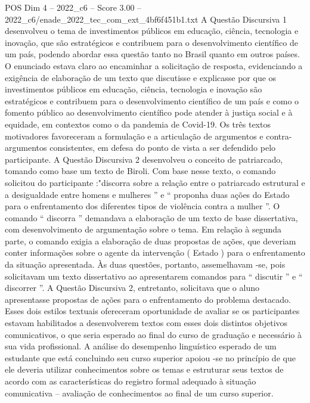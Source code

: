\begin{textsample}{POS Dim 4 – 2022\_c6 – Score 3.00 – 2022\_c6/enade\_2022\_tec\_com\_ext\_4bf6f451b1.txt}
A Questão Discursiva 1 desenvolveu o tema de investimentos públicos em educação, ciência, tecnologia e inovação, que são estratégicos e contribuem para o desenvolvimento científico de um país, podendo abordar essa questão tanto no Brasil quanto em outros países.
O enunciado estava claro ao encaminhar a solicitação de resposta, evidenciando a exigência de elaboração de um texto que discutisse e explicasse por que os investimentos públicos em educação, ciência, tecnologia e inovação são estratégicos e contribuem para o desenvolvimento científico de um país e como o fomento público ao desenvolvimento científico pode atender à justiça social e à equidade, em contextos como o da pandemia de Covid-19.
Os três textos motivadores favoreceram a formulação e a articulação de argumentos e contra-argumentos consistentes, em defesa do ponto de vista a ser defendido pelo participante.
A Questão Discursiva 2 desenvolveu o conceito de patriarcado, tomando como base um texto de Biroli.
Com base nesse texto, o comando solicitou do participante :"discorra sobre a relação entre o patriarcado estrutural e a desigualdade entre homens e mulheres ” e “ proponha duas ações do Estado para o enfrentamento dos diferentes tipos de violência contra a mulher ”.
O comando “ discorra ” demandava a elaboração de um texto de base dissertativa, com desenvolvimento de argumentação sobre o tema.
Em relação à segunda parte, o comando exigia a elaboração de duas propostas de ações, que deveriam conter informações sobre o agente da intervenção ( Estado ) para o enfrentamento da situação apresentada.
Às duas questões, portanto, assemelhavam -se, pois solicitavam um texto dissertativo ao apresentarem comandos para “ discutir ” e “ discorrer ”.
A Questão Discursiva 2, entretanto, solicitava que o aluno apresentasse propostas de ações para o enfrentamento do problema destacado.
Esses dois estilos textuais ofereceram oportunidade de avaliar se os participantes estavam habilitados a desenvolverem textos com esses dois distintos objetivos comunicativos, o que seria esperado ao final do curso de graduação e necessário à sua vida profissional.
A análise do desempenho linguístico esperado de um estudante que está concluindo seu curso superior apoiou -se no princípio de que ele deveria utilizar conhecimentos sobre os temas e estruturar seus textos de acordo com as características do registro formal adequado à situação comunicativa – avaliação de conhecimentos ao final de um curso superior.

\end{textsample}
